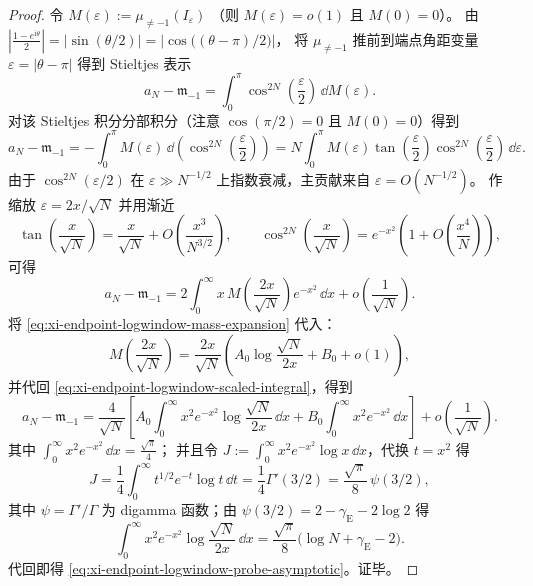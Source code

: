 \begin{proof}
令
\(
M(\varepsilon):=\mu_{\neq -1}(I_{\varepsilon})
\)
（则 \(M(\varepsilon)=o(1)\) 且 \(M(0)=0\)）。
由 \(\left|\frac{1-e^{\mathrm{i}\theta}}{2}\right|=\left|\sin(\theta/2)\right|
=\left|\cos\bigl((\theta-\pi)/2\bigr)\right|\)，
将 \(\mu_{\neq -1}\) 推前到端点角距变量 \(\varepsilon=|\theta-\pi|\) 得到 Stieltjes 表示
\[
a_N-\mathfrak m_{-1}
=\int_{0}^{\pi}\cos^{2N}\!\left(\frac{\varepsilon}{2}\right)\,\dd M(\varepsilon).
\]
对该 Stieltjes 积分分部积分（注意 \(\cos(\pi/2)=0\) 且 \(M(0)=0\)）得到
\[
a_N-\mathfrak m_{-1}
=-\int_{0}^{\pi}M(\varepsilon)\,\dd\!\left(\cos^{2N}\!\left(\frac{\varepsilon}{2}\right)\right)
=N\int_{0}^{\pi}M(\varepsilon)\tan\!\left(\frac{\varepsilon}{2}\right)\cos^{2N}\!\left(\frac{\varepsilon}{2}\right)\,\dd\varepsilon.
\]
由于 \(\cos^{2N}(\varepsilon/2)\) 在 \(\varepsilon\gg N^{-1/2}\) 上指数衰减，主贡献来自 \(\varepsilon=O(N^{-1/2})\)。
作缩放 \(\varepsilon=2x/\sqrt N\) 并用渐近
\[
\tan\!\left(\frac{x}{\sqrt N}\right)=\frac{x}{\sqrt N}+O\!\left(\frac{x^{3}}{N^{3/2}}\right),
\qquad
\cos^{2N}\!\left(\frac{x}{\sqrt N}\right)=e^{-x^{2}}\left(1+O\!\left(\frac{x^{4}}{N}\right)\right),
\]
可得
\begin{equation}\label{eq:xi-endpoint-logwindow-scaled-integral}
a_N-\mathfrak m_{-1}
=2\int_{0}^{\infty}x\,M\!\left(\frac{2x}{\sqrt N}\right)e^{-x^{2}}\,\dd x
+o\!\left(\frac{1}{\sqrt N}\right).
\end{equation}
将 \eqref{eq:xi-endpoint-logwindow-mass-expansion} 代入：
\[
M\!\left(\frac{2x}{\sqrt N}\right)
=\frac{2x}{\sqrt N}\left(A_0\log\frac{\sqrt N}{2x}+B_0+o(1)\right),
\]
并代回 \eqref{eq:xi-endpoint-logwindow-scaled-integral}，得到
\[
a_N-\mathfrak m_{-1}
=\frac{4}{\sqrt N}\left[
A_0\int_{0}^{\infty}x^{2}e^{-x^{2}}\log\frac{\sqrt N}{2x}\,\dd x
+B_0\int_{0}^{\infty}x^{2}e^{-x^{2}}\,\dd x
\right]
+o\!\left(\frac{1}{\sqrt N}\right).
\]
其中
\(
\int_{0}^{\infty}x^{2}e^{-x^{2}}\,\dd x=\frac{\sqrt{\pi}}{4}
\)；
并且令
\(
J:=\int_{0}^{\infty}x^{2}e^{-x^{2}}\log x\,\dd x
\)，代换 \(t=x^{2}\) 得
\[
J=\frac14\int_{0}^{\infty}t^{1/2}e^{-t}\log t\,\dd t=\frac14\Gamma'(3/2)
=\frac{\sqrt{\pi}}{8}\,\psi(3/2),
\]
其中 \(\psi=\Gamma'/\Gamma\) 为 digamma 函数；由 \(\psi(3/2)=2-\gamma_{\mathrm E}-2\log 2\) 得
\[
\int_{0}^{\infty}x^{2}e^{-x^{2}}\log\frac{\sqrt N}{2x}\,\dd x
=\frac{\sqrt{\pi}}{8}\bigl(\log N+\gamma_{\mathrm E}-2\bigr).
\]
代回即得 \eqref{eq:xi-endpoint-logwindow-probe-asymptotic}。证毕。
\end{proof}

